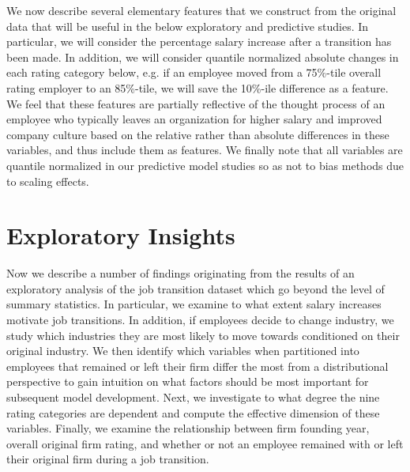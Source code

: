 \documentclass[10pt]{article}
\begin{document}
We now describe several elementary features that we construct from the original data that 
will be useful in the below exploratory and predictive studies.  In particular, we will 
consider the percentage salary increase after a transition has been made. 
In addition, we will consider quantile normalized absolute changes in each rating 
category below, e.g. if an employee moved from a 75\%-tile overall rating employer 
to an 85\%-tile, we will save the 10\%-ile difference as a feature.  We feel that these 
features are partially reflective of the thought process of an employee who typically leaves an organization 
for higher salary and improved company culture based on the relative rather than absolute 
differences in these variables, and thus include them as features.  We finally note that 
all variables are quantile normalized in our predictive model studies so as not to bias 
methods due to scaling effects.

\section{Exploratory Insights} \label{datstu}

\hspace{\parindent} Now we describe a number of findings originating from the results of an exploratory analysis of 
the job transition dataset which go beyond the level of summary statistics.  In particular, 
we examine to what extent salary increases motivate job transitions.  In addition, if employees decide to 
change industry, we study which industries they are most likely to move towards conditioned 
on their original industry.  We then 
identify which variables when partitioned into employees that remained or left their 
firm differ the most from a distributional perspective to gain intuition on what 
factors should be most important for subsequent model development.  Next, 
we investigate to what degree the nine rating categories are dependent and 
compute the effective dimension of these variables.  Finally, we examine the relationship 
between firm founding year, overall original firm rating, and whether or not an employee 
remained with or left their original firm during a job transition.
\end{document}
